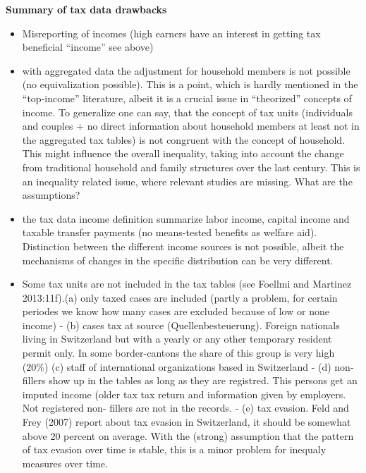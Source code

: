 
\textbf{Summary of tax data drawbacks }
\begin{itemize}
\item Misreporting of incomes (high earners have an interest in getting tax beneficial “income” see above)
\item with aggregated data the adjustment for household members is not possible (no equivalization possible). This is a point, which is hardly mentioned in the “top-income” literature, albeit it is a crucial issue in “theorized” concepts of income. To generalize one can say, that the concept of tax units (individuals and couples + no direct information about household members at least not in the aggregated tax tables) is not congruent with the concept of household. This might influence the overall inequality, taking into account the change from traditional household and family structures over the last century. This is an inequality related issue, where relevant studies are missing. What are the assumptions?
\item the tax data income definition summarize labor income, capital income and taxable transfer payments (no means-tested benefits as welfare aid). Distinction between the different income sources is not possible, albeit the mechanisms of changes in the specific distribution can be very different.
\item Some tax units are not included in the tax tables (see Foellmi and Martinez 2013:11f).(a) only taxed cases are included (partly a problem, for certain periodes we know how many cases are excluded because of low or none income)	- (b) cases tax at source (Quellenbesteuerung). Foreign nationals living in Switzerland but with a yearly or any other temporary resident permit only. In some border-cantons the share of this group is very high (20\%) 
(c) staff of international organizations based in Switzerland	- (d) non-fillers show up in the tables as long as they are registred. This persons get an imputed income (older tax tax return and information given by employers. Not registered non-	fillers are not in the records.
- (e) tax evasion. Feld and Frey (2007) report about tax evasion in Switzerland, it should be somewhat above 20 percent on average. With the (strong) assumption that the pattern of tax evasion over time is stable, this is a minor problem for inequaly measures over time.
\end{itemize}

